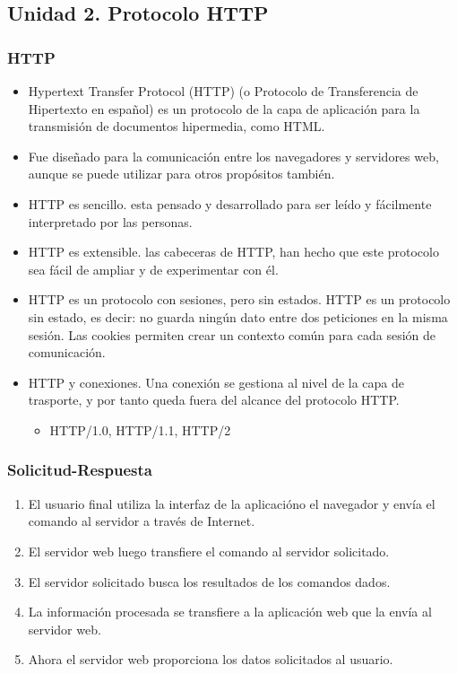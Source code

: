 \documentclass[11pt]{article}
\begin{document}
\subsection{Unidad 2. Protocolo HTTP}
\label{sec:orgd55a62c}
\subsubsection{HTTP}
\label{sec:orge148eca}
\begin{itemize}
\item Hypertext Transfer Protocol (HTTP) (o Protocolo de Transferencia de Hipertexto en español) es un protocolo de la capa de aplicación para la transmisión de documentos hipermedia, como HTML.
\item Fue diseñado para la comunicación entre los navegadores y servidores web, aunque se puede utilizar para otros propósitos también.

\item HTTP es sencillo. esta pensado y desarrollado para ser leído y fácilmente interpretado por las personas.
\item HTTP es extensible. las cabeceras de HTTP, han hecho que este protocolo sea fácil de ampliar y de experimentar con él.
\item HTTP es un protocolo con sesiones, pero sin estados. HTTP es un protocolo sin estado, es decir: no guarda ningún dato entre dos peticiones en la misma sesión. Las cookies permiten crear un contexto común para cada sesión de comunicación.
\item HTTP y conexiones. Una conexión se gestiona al nivel de la capa de trasporte, y por tanto queda fuera del alcance del protocolo HTTP.
\begin{itemize}
\item HTTP/1.0, HTTP/1.1, HTTP/2
\end{itemize}
\end{itemize}
\subsubsection{Solicitud-Respuesta}
\label{sec:org87cec2e}
\begin{enumerate}
\item El usuario final utiliza la interfaz de la aplicacióno el navegador y envía el comando al servidor a través de Internet.
\item El servidor web luego transfiere el comando al servidor solicitado.
\item El servidor solicitado busca los resultados de los comandos dados.
\item La información procesada se transfiere a la aplicación web que la envía al servidor web.
\item Ahora el servidor web proporciona los datos solicitados al usuario.
\end{enumerate}
\end{document}
